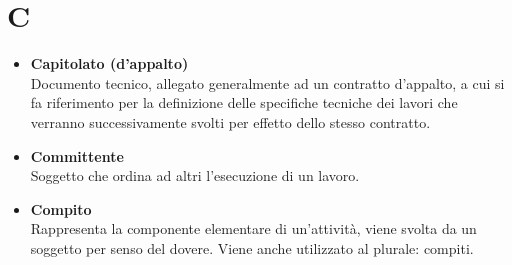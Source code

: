\chapter{C} \label{C}
\begin{itemize}
	\item \textbf{Capitolato (d'appalto)}\\
	Documento tecnico, allegato generalmente ad un contratto d'appalto, a cui si fa riferimento per la definizione delle specifiche tecniche dei lavori che verranno successivamente svolti per effetto dello stesso contratto.
	
	\item \textbf{Committente}\\
	Soggetto che ordina ad altri l'esecuzione di un lavoro.
	
	\item \textbf{Compito}\\
	Rappresenta la componente elementare di un'attività, viene svolta da un soggetto per senso del dovere.
	Viene anche utilizzato al plurale: compiti.
\end{itemize}